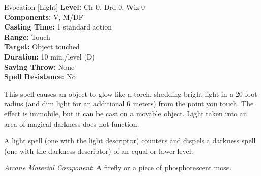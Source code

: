 {Evocation [Light]}
{
	\textbf{Level:}
	Clr 0, Drd 0, Wiz 0\\
	\textbf{Components:}
	V, M/DF\\
	\textbf{Casting Time:}
	1 standard action\\
	\textbf{Range:}
	Touch\\
	\textbf{Target:}
	Object touched\\
	\textbf{Duration:}
	10 min./level (D)\\
	\textbf{Saving Throw:}
	None\\
	\textbf{Spell Resistance:}
	No\\
}
{
	This spell causes an object to glow like a torch, shedding bright light in a 20-foot radius (and dim light for an additional 6 meters) from the point you touch. The effect is immobile, but it can be cast on a movable object. Light taken into an area of magical darkness does not function.

	A light spell (one with the light descriptor) counters and dispels a darkness spell (one with the darkness descriptor) of an equal or lower level.

	\textit{Arcane Material Component}:
	A firefly or a piece of phosphorescent moss.

}
